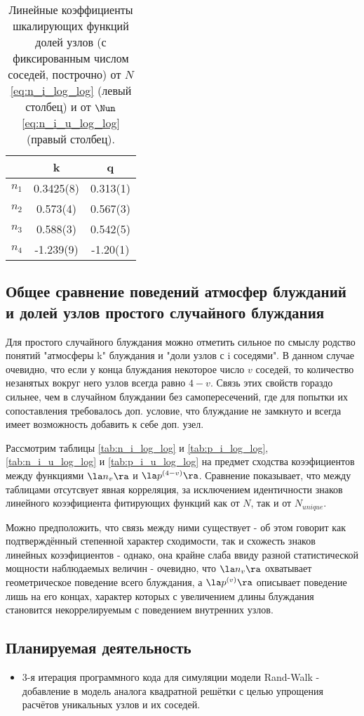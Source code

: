\begin{table}[h]
\centering
\begin{tabular}{|c|c|c|}
\hline
 & k & q \\ \hline
$n_1$ & 0.3425(8) &  0.313(1) \\ \hline
$n_2$ & 0.573(4) & 0.567(3) \\ \hline
$n_3$ & 0.588(3) & 0.542(5) \\ \hline
$n_4$ & -1.239(9) & -1.20(1) \\ \hline
\end{tabular}
\caption{Линейные коэффициенты шкалирующих функций долей узлов (с фиксированным числом соседей, построчно) от $N$ \eqref{eq:n_i_log_log} (левый столбец) и от $\Nun$ \eqref{eq:n_i_u_log_log} (правый столбец).}
\label{tab:kq_atm_compare}
\end{table}


\newpage

\subsection{Общее сравнение поведений атмосфер блужданий и долей узлов простого случайного блуждания}

Для простого случайного блуждания можно отметить сильное по смыслу родство понятий "атмосферы k" блуждания и "доли узлов с i соседями". 
В данном случае очевидно, что если у конца блуждания некоторое число $v$ соседей, то количество незанятых вокруг него узлов всегда равно $4-v$. 
Связь этих свойств гораздо сильнее, чем в случайном блуждании без самопересечений, где для попытки их сопоставления требовалось доп. условие, что блуждание не замкнуто и всегда имеет возможность добавить к себе доп. узел.

Рассмотрим таблицы \ref{tab:n_i_log_log} и \ref{tab:p_i_log_log}, \ref{tab:n_i_u_log_log} и \ref{tab:p_i_u_log_log} на предмет сходства коээфициентов между функциями $\la n_v \ra$ и $\la p^{(4-v)} \ra$.
Сравнение показывает, что между таблицами отсутсвует явная корреляция, за исключением идентичности знаков линейного коээфициента фитирующих функций как от $N$, так и от $N_{unique}$. 

Можно предположить, что связь между ними существует - об этом говорит как подтверждённый степенной характер сходимости, так и схожесть знаков линейных коээфициентов - однако, она крайне слаба ввиду разной статистической мощности наблюдаемых величин - очевидно, что $\la n_v \ra$ охватывает геометрическое поведение всего блуждания, а $\la p^{(v)} \ra$ описывает поведение лишь на его концах, характер которых с увеличением длины блуждания становится некоррелируемым с поведением внутренних узлов.

\newpage

\subsection{Планируемая деятельность}

\begin{itemize}
\item 3-я итерация программного кода для симуляции модели Rand-Walk - добавление в модель аналога квадратной решётки с целью упрощения расчётов уникальных узлов и их соседей.
\end{itemize}
